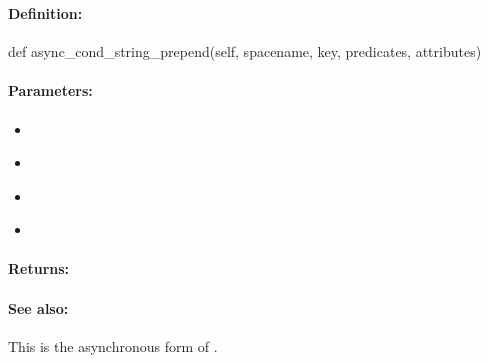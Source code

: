\pagebreak
\subsubsection{}
\label{api:python:async_cond_string_prepend}


\paragraph{Definition:}
\begin{pythoncode}
def async_cond_string_prepend(self, spacename, key, predicates, attributes)
\end{pythoncode}

\paragraph{Parameters:}
\begin{itemize}[noitemsep]
\item {}\\

\item {}\\

\item {}\\

\item {}\\

\end{itemize}

\paragraph{Returns:}


\paragraph{See also:}  This is the asynchronous form of .

\pagebreak
\subsubsection{}
\label{api:python:string_append}


